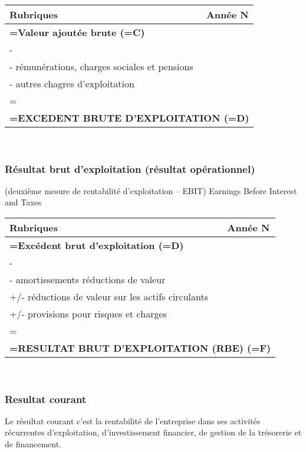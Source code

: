 \documentclass{article}
\begin{document}
\begin{center}
\begin{tabular}{|l|c|}
    \hline
    \textbf{Rubriques} & \textbf{Année N}\\
    \hline
    \multicolumn{2}{|l|}{\textbf{=Valeur ajoutée brute (=C)}}   \\
    \hline
    \multicolumn{2}{l}{ - }\\
    \hline
    - rémunérations, charges sociales et pensions &\\
    - autres chagres d'exploitation & \\
    \hline
    \multicolumn{2}{l}{ = }\\
    \hline
    \multicolumn{2}{|l|}{\textbf{=EXCEDENT BRUTE D'EXPLOITATION (=D)}}   \\
    \hline
\end{tabular}
\end{center}
\\ 
\subsubsection*{Résultat brut d'exploitation (résultat opérationnel)}
(deuxième mesure de rentabilité d’exploitation – EBIT)
Earnings Before Interest and Taxes

\begin{center}
\begin{tabular}{|l|c|}
    \hline
    \textbf{Rubriques} & \textbf{Année N}\\
    \hline
    \multicolumn{2}{|l|}{\textbf{=Excédent brut d'exploitation (=D)}}   \\
    \hline
    \multicolumn{2}{l}{ - }\\
    \hline
    - amortissements réductions de valeur &\\
    +/- réductions de valeur sur les actifs circulants & \\
    +/- provisions pour risques et charges & \\
    \hline
    \multicolumn{2}{l}{ = }\\
    \hline
    \multicolumn{2}{|l|}{\textbf{=RESULTAT BRUT D'EXPLOITATION (RBE) (=F)}}   \\
    \hline
\end{tabular}
\end{center}
\\
\subsubsection*{Resultat courant}
Le résultat courant c'est la rentabilité de l’entreprise dans ses activités récurrentes d’exploitation, d’investissement financier, de gestion de la trésorerie et de financement.
\end{document}
